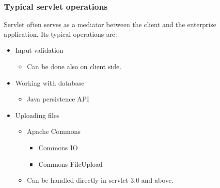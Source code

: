 \documentclass[10pt,xcolor=pdflatex]{beamer}
\begin{document}
\begin{frame}[containsverbatim]\frametitle{Typical servlet operations}
Servlet often serves as a mediator between the client and the enterprise application. Its typical operations are:
\begin{itemize}
	\item Input validation
	  \begin{itemize} 
    	\item Can be done also on client side.
      \end{itemize}
	\item Working with database
      \begin{itemize}
		\item Java persistence API
      \end{itemize}
	\item Uploading files
      \begin{itemize}
		\item Apache Commons
          \begin{itemize}
            \item Commons IO
            \item Commons FileUpload
          \end{itemize}
    	\item Can be handled directly in servlet 3.0 and above.
	  \end{itemize}
\end{itemize}
\end{frame}
\end{document}
